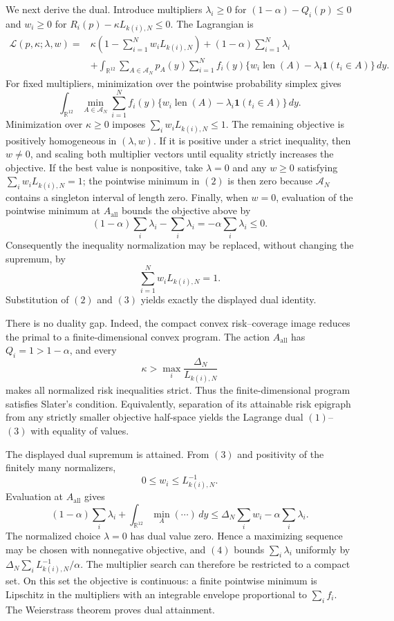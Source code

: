 We next derive the dual.  Introduce multipliers \(\lambda_i\geq0\) for
\((1-\alpha)-Q_i(p)\leq0\) and \(w_i\geq0\) for
\(R_i(p)-\kappa L_{k(i),N}\leq0\).  The Lagrangian is
\[
\begin{split}
 \mathcal L(p,\kappa;\lambda,w)
 ={}&\kappa\left(1-\sum_{i=1}^Nw_iL_{k(i),N}\right)
 +(1-\alpha)\sum_{i=1}^N\lambda_i\\
 &+\int_{\mathbb R^{12}}\sum_{A\in\mathcal A_N}p_A(y)
 \sum_{i=1}^N f_i(y)
 \{w_i\operatorname{len}(A)-\lambda_i\mathbf1(t_i\in A)\}\,dy.
\end{split}
\tag{1}
\]
For fixed multipliers, minimization over the pointwise probability simplex
gives
\[
 \int_{\mathbb R^{12}}\min_{A\in\mathcal A_N}
 \sum_{i=1}^N f_i(y)
 \{w_i\operatorname{len}(A)-\lambda_i\mathbf1(t_i\in A)\}\,dy.
\tag{2}
\]
Minimization over \(\kappa\geq0\) imposes
\(\sum_iw_iL_{k(i),N}\leq1\).  The remaining objective is positively
homogeneous in \((\lambda,w)\).  If it is positive under a strict inequality,
then \(w\neq0\), and scaling both multiplier vectors until equality strictly
increases the objective.  If the best value is nonpositive, take
\(\lambda=0\) and any \(w\geq0\) satisfying
\(\sum_iw_iL_{k(i),N}=1\); the pointwise minimum in \((2)\) is then zero
because \(\mathcal A_N\) contains a singleton interval of length zero.
Finally, when \(w=0\), evaluation of the pointwise minimum at
\(A_{\mathrm{all}}\) bounds the objective above by
\[
 (1-\alpha)\sum_i\lambda_i-\sum_i\lambda_i
 =-\alpha\sum_i\lambda_i\leq0.
\]
Consequently the inequality normalization may be replaced, without changing
the supremum, by
\[
 \sum_{i=1}^Nw_iL_{k(i),N}=1.
\tag{3}
\]
Substitution of \((2)\) and \((3)\) yields exactly the displayed dual
identity.

There is no duality gap.  Indeed, the compact convex risk--coverage image
reduces the primal to a finite-dimensional convex program.  The action
\(A_{\mathrm{all}}\) has \(Q_i=1>1-\alpha\), and every
\[
 \kappa>\max_i\frac{\Delta_N}{L_{k(i),N}}
\]
makes all normalized risk inequalities strict.  Thus the finite-dimensional
program satisfies Slater's condition.  Equivalently, separation of its
attainable risk epigraph from any strictly smaller objective half-space yields
the Lagrange dual \((1)\)--\((3)\) with equality of values.

The displayed dual supremum is attained.  From \((3)\) and positivity of the
finitely many normalizers,
\[
 0\leq w_i\leq L_{k(i),N}^{-1}.
\]
Evaluation at \(A_{\mathrm{all}}\) gives
\[
 (1-\alpha)\sum_i\lambda_i+
 \int_{\mathbb R^{12}}\min_A(\cdots)\,dy
 \leq \Delta_N\sum_iw_i-\alpha\sum_i\lambda_i.
\tag{4}
\]
The normalized choice \(\lambda=0\) has dual value zero.  Hence a maximizing
sequence may be chosen with nonnegative objective, and \((4)\) bounds
\(\sum_i\lambda_i\) uniformly by
\(\Delta_N\sum_iL_{k(i),N}^{-1}/\alpha\).  The multiplier search can
therefore be restricted to a compact set.  On this set the objective is
continuous: a finite pointwise minimum is Lipschitz in the multipliers with an
integrable envelope proportional to \(\sum_i f_i\).  The Weierstrass theorem
proves dual attainment.

